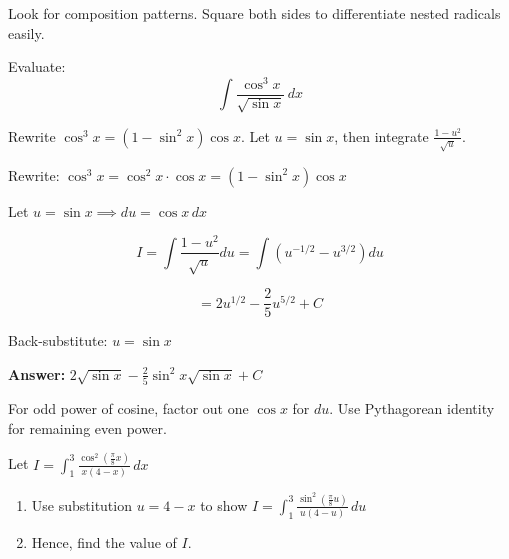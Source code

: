 \begin{takeaways}
Look for composition patterns. Square both sides to differentiate nested radicals easily.
\end{takeaways}

\vspace{1cm}

\begin{problem}
Evaluate:
\[
\int \frac{\cos^3 x}{\sqrt{\sin x}} \, dx
\]
\end{problem}

\begin{hint}
Rewrite $\cos^3 x = (1-\sin^2 x)\cos x$. Let $u = \sin x$, then integrate $\frac{1-u^2}{\sqrt{u}}$.
\end{hint}

\begin{solution}
Rewrite: $\cos^3 x = \cos^2 x \cdot \cos x = (1-\sin^2 x)\cos x$

Let $u = \sin x \implies du = \cos x \, dx$

\[
I = \int \frac{1-u^2}{\sqrt{u}} du = \int (u^{-1/2} - u^{3/2}) du
\]

\[
= 2u^{1/2} - \frac{2}{5}u^{5/2} + C
\]

Back-substitute: $u = \sin x$

\textbf{Answer:} $\boxed{2\sqrt{\sin x} - \frac{2}{5}\sin^2 x\sqrt{\sin x} + C}$
\end{solution}

\begin{takeaways}
For odd power of cosine, factor out one $\cos x$ for $du$. Use Pythagorean identity for remaining even power.
\end{takeaways}

\vspace{1cm}

\begin{problem}
Let $I = \int_{1}^{3} \frac{\cos^2 \left(\frac{\pi}{8}x\right)}{x(4-x)} \, dx$

\begin{enumerate}[label=(\roman*)]
\item Use substitution $u = 4-x$ to show $I = \int_{1}^{3} \frac{\sin^2 \left(\frac{\pi}{8}u\right)}{u(4-u)} \, du$
\item Hence, find the value of $I$.
\end{enumerate}
\end{problem}

